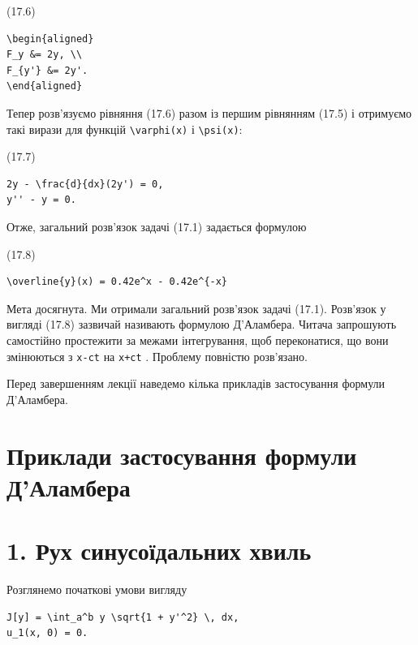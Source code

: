 \documentclass[
  ukrainian,
]{article}
\begin{document}
(17.6)

\begin{verbatim}
\begin{aligned}
F_y &= 2y, \\
F_{y'} &= 2y'.
\end{aligned}
\end{verbatim}

Тепер розв'язуємо рівняння (17.6) разом із першим рівнянням (17.5) і
отримуємо такі вирази для функцій \texttt{\textbackslash{}varphi(x)} і
\texttt{\textbackslash{}psi(x)}:

(17.7)

\begin{verbatim}
2y - \frac{d}{dx}(2y') = 0,
y'' - y = 0.
\end{verbatim}

Отже, загальний розв'язок задачі (17.1) задається формулою

(17.8)

\begin{verbatim}
\overline{y}(x) = 0.42e^x - 0.42e^{-x}
\end{verbatim}

Мета досягнута. Ми отримали загальний розв'язок задачі (17.1). Розв'язок
у вигляді (17.8) зазвичай називають формулою Д'Аламбера. Читача
запрошують самостійно простежити за межами інтегрування, щоб
переконатися, що вони змінюються з \texttt{x-ct} на \texttt{x+ct} .
Проблему повністю розв'язано.

Перед завершенням лекції наведемо кілька прикладів застосування формули
Д'Аламбера.

\section{Приклади застосування формули
Д'Аламбера}\label{ux43fux440ux438ux43aux43bux430ux434ux438-ux437ux430ux441ux442ux43eux441ux443ux432ux430ux43dux43dux44f-ux444ux43eux440ux43cux443ux43bux438-ux434ux430ux43bux430ux43cux431ux435ux440ux430}

\section{1. Рух синусоїдальних
хвиль}\label{ux440ux443ux445-ux441ux438ux43dux443ux441ux43eux457ux434ux430ux43bux44cux43dux438ux445-ux445ux432ux438ux43bux44c}

Розглянемо початкові умови вигляду

\begin{verbatim}
J[y] = \int_a^b y \sqrt{1 + y'^2} \, dx,
u_1(x, 0) = 0.
\end{verbatim}
\end{document}
